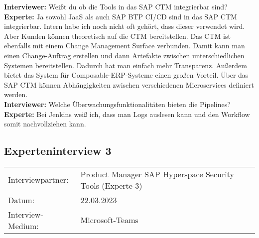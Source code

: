 \begin{linenumbers}
    \textbf{Interviewer:} Weißt du ob die Tools in das SAP CTM integrierbar sind?\\
    \textbf{Experte:} Ja sowohl JaaS als auch SAP BTP CI/CD sind in das SAP CTM integrierbar. Intern habe ich noch nicht oft gehört, dass dieser verwendet wird. Aber Kunden können theoretisch auf die CTM bereitstellen. Das CTM ist ebenfalls mit einem Change Management Surface verbunden. Damit kann man einen Change-Auftrag erstellen und dann Artefakte zwischen unterschiedlichen Systemen bereitstellen. Dadurch hat man einfach mehr Transparenz. Außerdem bietet das System für Composable-ERP-Systeme einen großen Vorteil. Über das SAP CTM können Abhängigkeiten zwischen verschiedenen Microservices definiert werden.\\
    \textbf{Interviewer:} Welche Überwachungsfunktionalitäten bieten die Pipelines?\\
    \textbf{Experte:} Bei Jenkins weiß ich, dass man Logs auslesen kann und den Workflow somit nachvollziehen kann.
\end{linenumbers}
\newpage
\resetlinenumber
\subsection{Experteninterview 3}
	\begin{tabular}{ l l }
		Interviewpartner: & Product Manager SAP Hyperspace Security Tools (Experte 3)\\
		Datum: & 22.03.2023\\
		Interview-Medium: & Microsoft-Teams\\
\end{tabular}\\\\

